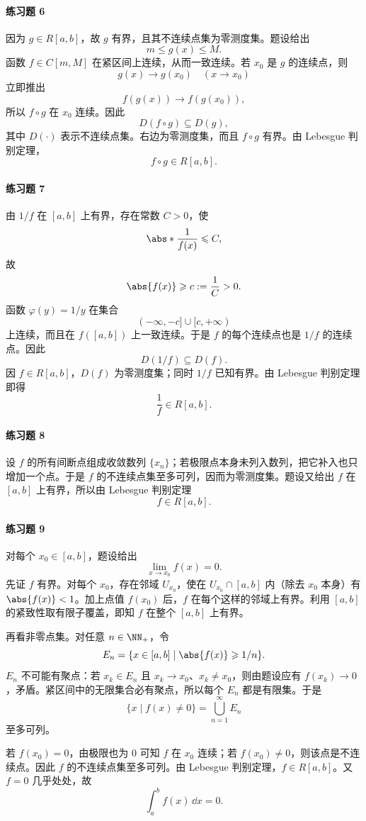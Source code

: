 \paragraph{练习题 6}
\begin{xsolution}
因为 $g\in R[a,b]$，故 $g$ 有界，且其不连续点集为零测度集。题设给出
\[
  m\leqslant g(x)\leqslant M.
\]
函数 $f\in C[m,M]$ 在紧区间上连续，从而一致连续。若 $x_0$ 是 $g$ 的连续点，则
\[
  g(x)\to g(x_0)\quad(x\to x_0)
\]
立即推出
\[
  f(g(x))\to f(g(x_0)),
\]
所以 $f\circ g$ 在 $x_0$ 连续。因此
\[
  D(f\circ g)\subseteq D(g),
\]
其中 $D(\cdot)$ 表示不连续点集。右边为零测度集，而且 $f\circ g$ 有界。由 Lebesgue 判别定理，
\[
  f\circ g\in R[a,b].
\]
\end{xsolution}

\paragraph{练习题 7}
\begin{xsolution}
由 $1/f$ 在 $[a,b]$ 上有界，存在常数 $C>0$，使
\[
  \abs*{\frac1{f(x)}}\leqslant C,
\]
故
\[
  \abs{f(x)}\geqslant c:=\frac1C>0.
\]
函数 $\varphi(y)=1/y$ 在集合
\[
  (-\infty,-c]\cup[c,+\infty)
\]
上连续，而且在 $f([a,b])$ 上一致连续。于是 $f$ 的每个连续点也是 $1/f$ 的连续点。因此
\[
  D(1/f)\subseteq D(f).
\]
因 $f\in R[a,b]$，$D(f)$ 为零测度集；同时 $1/f$ 已知有界。由 Lebesgue 判别定理即得
\[
  \frac1f\in R[a,b].
\]
\end{xsolution}

\paragraph{练习题 8}
\begin{xsolution}
设 $f$ 的所有间断点组成收敛数列 $\{x_n\}$；若极限点本身未列入数列，把它补入也只增加一个点。于是 $f$ 的不连续点集至多可列，因而为零测度集。题设又给出 $f$ 在 $[a,b]$ 上有界，所以由 Lebesgue 判别定理
\[
  f\in R[a,b].
\]
\end{xsolution}

\paragraph{练习题 9}
\begin{xsolution}
对每个 $x_0\in[a,b]$，题设给出
\[
  \lim_{x\to x_0}f(x)=0.
\]
先证 $f$ 有界。对每个 $x_0$，存在邻域 $U_{x_0}$，使在 $U_{x_0}\cap[a,b]$ 内（除去 $x_0$ 本身）有 $\abs{f(x)}<1$。加上点值 $f(x_0)$ 后，$f$ 在每个这样的邻域上有界。利用 $[a,b]$ 的紧致性取有限子覆盖，即知 $f$ 在整个 $[a,b]$ 上有界。

再看非零点集。对任意 $n\in\NN_+$，令
\[
  E_n=\{x\in[a,b]\mid \abs{f(x)}\geqslant1/n\}.
\]
$E_n$ 不可能有聚点：若 $x_k\in E_n$ 且 $x_k\to x_0$、$x_k\ne x_0$，则由题设应有 $f(x_k)\to0$，矛盾。紧区间中的无限集合必有聚点，所以每个 $E_n$ 都是有限集。于是
\[
  \{x\mid f(x)\ne0\}=\bigcup_{n=1}^\infty E_n
\]
至多可列。

若 $f(x_0)=0$，由极限也为 $0$ 可知 $f$ 在 $x_0$ 连续；若 $f(x_0)\ne0$，则该点是不连续点。因此 $f$ 的不连续点集至多可列。由 Lebesgue 判别定理，$f\in R[a,b]$。又 $f=0$ 几乎处处，故
\[
  \boxed{\int_a^b f(x)\,\dd x=0}.
\]
\end{xsolution}

